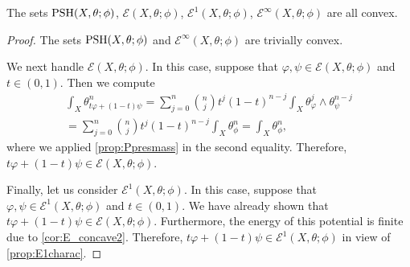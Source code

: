 \begin{corollary}\label{cor:E_classes_convex}
    The sets $\mathrm{PSH}(X,\theta;\phi)$, $\mathcal{E}(X,\theta;\phi)$, $\mathcal{E}^1(X,\theta;\phi)$, $\mathcal{E}^{\infty}(X,\theta;\phi)$ are all convex.
\end{corollary}
\begin{proof}
    The sets $\mathrm{PSH}(X,\theta;\phi)$ and $\mathcal{E}^{\infty}(X,\theta;\phi)$ are trivially convex.

    We next handle $\mathcal{E}(X,\theta;\phi)$. In this case, suppose that $\varphi,\psi \in \mathcal{E}(X,\theta;\phi)$ and $t\in (0,1)$. Then we compute
    \[
    \begin{split}
        \int_X \theta_{t\varphi+(1-t)\psi}^n=\sum_{j=0}^n \binom{n}{j}t^j (1-t)^{n-j} \int_X \theta_{\varphi}^j\wedge \theta_{\psi}^{n-j}\\
        =\sum_{j=0}^n \binom{n}{j}t^j (1-t)^{n-j} \int_X \theta_{\phi}^n=\int_X \theta_{\phi}^n,
    \end{split}
    \]
    where we applied \cref{prop:Ppresmass} in the second equality. Therefore, $t\varphi+(1-t)\psi \in \mathcal{E}(X,\theta;\phi)$.

    Finally, let us consider $\mathcal{E}^1(X,\theta;\phi)$. In this case, suppose that $\varphi,\psi \in \mathcal{E}^1(X,\theta;\phi)$ and $t\in (0,1)$. We have already shown that $t\varphi+(1-t)\psi \in \mathcal{E}(X,\theta;\phi)$. Furthermore, the energy of this potential is finite due to \cref{cor:E_concave2}. Therefore, $t\varphi+(1-t)\psi \in \mathcal{E}^1(X,\theta;\phi)$ in view of \cref{prop:E1charac}.
\end{proof}


